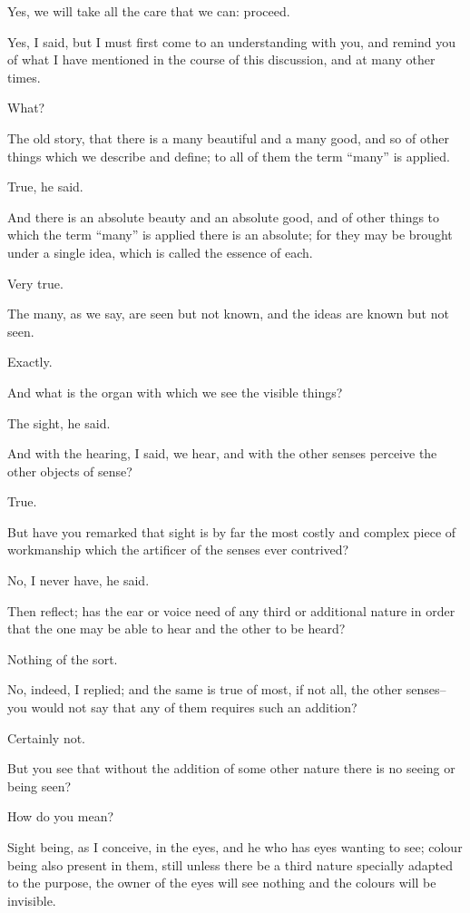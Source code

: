 Yes, we will take all the care that we can: proceed.

Yes, I said, but I must first come to an understanding with you, and
remind you of what I have mentioned in the course of this discussion,
and at many other times.

What?

The old story, that there is a many beautiful and a many good, and so
of other things which we describe and define; to all of them the term
``many'' is applied.

True, he said.

And there is an absolute beauty and an absolute good, and of other
things to which the term ``many'' is applied there is an absolute; for
they may be brought under a single idea, which is called the essence of
each.

Very true.

The many, as we say, are seen but not known, and the ideas are known but
not seen.

Exactly.

And what is the organ with which we see the visible things?

The sight, he said.

And with the hearing, I said, we hear, and with the other senses
perceive the other objects of sense?

True.

But have you remarked that sight is by far the most costly and complex
piece of workmanship which the artificer of the senses ever contrived?

No, I never have, he said.

Then reflect; has the ear or voice need of any third or additional
nature in order that the one may be able to hear and the other to be
heard?

Nothing of the sort.

No, indeed, I replied; and the same is true of most, if not all, the
other senses--you would not say that any of them requires such an
addition?

Certainly not.

But you see that without the addition of some other nature there is no
seeing or being seen?

How do you mean?

Sight being, as I conceive, in the eyes, and he who has eyes wanting to
see; colour being also present in them, still unless there be a third
nature specially adapted to the purpose, the owner of the eyes will see
nothing and the colours will be invisible.

